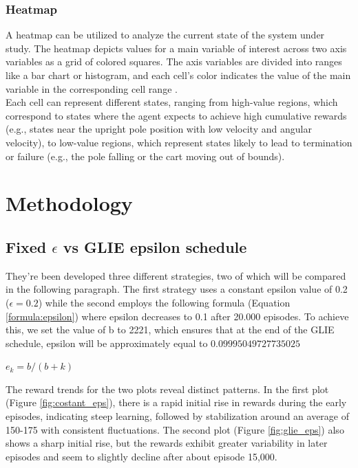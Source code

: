\documentclass{article}
\begin{document}

\subsubsection{Heatmap}
A heatmap can be utilized to analyze the current state of the system under study. The heatmap depicts values for a main variable of interest across two axis variables as a grid of colored squares. The axis variables are divided into ranges like a bar chart or histogram, and each cell’s color indicates the value of the main variable in the corresponding cell range \cite{heatmap}. \\ 

Each cell can represent different states, ranging from high-value regions, which correspond to states where the agent expects to achieve high cumulative rewards (e.g., states near the upright pole position with low velocity and angular velocity), to low-value regions, which represent states likely to lead to termination or failure (e.g., the pole falling or the cart moving out of bounds).

\newpage

\section{Methodology}

\subsection{Fixed $\epsilon$ vs GLIE epsilon schedule}
They're been developed three different strategies, two of which will be compared in the following paragraph. The first strategy uses a constant epsilon value of 0.2  ($\epsilon =  0.2$) while the second employs the following formula (Equation \ref{formula:epsilon}) where epsilon decreases to 0.1 after 20.000 episodes. To achieve this, we set the value of b to 2221, which ensures that at the end of the GLIE schedule, epsilon will be approximately equal to $0.09995049727735025$

\centering
\label{formula:epsilon}
$ e_k = b / (b+k) $ 

\flushleft

The reward trends for the two plots reveal distinct patterns. In the first plot (Figure \ref{fig:costant_eps}), there is a rapid initial rise in rewards during the early episodes, indicating steep learning, followed by stabilization around an average of 150-175 with consistent fluctuations. The second plot (Figure  \ref{fig:glie_eps})  also shows a sharp initial rise, but the rewards exhibit greater variability in later episodes and seem to slightly decline after about episode 15,000. 
\end{document}
